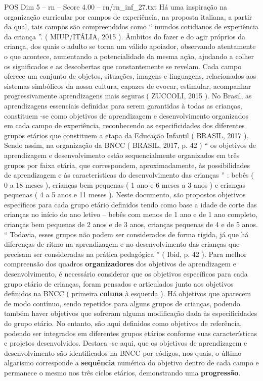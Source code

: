 \begin{textsample}{POS Dim 5 – rn – Score 4.00 – rn/rn\_inf\_27.txt}
Há uma inspiração na organização curricular por campos de experiência, na proposta italiana, a partir da qual, tais campos são compreendidos como “ mundos cotidianos de experiência da criança ”. ( MIUP/ITÁLIA, 2015 ).
Âmbitos do fazer e do agir próprios da criança, dos quais o adulto se torna um válido apoiador, observando atentamente o que acontece, aumentando a potencialidade da mesma ação, ajudando a colher os significados e as descobertas que constantemente se revelam.
Cada campo oferece um conjunto de objetos, situações, imagens e linguagens, relacionados aos sistemas simbólicos da nossa cultura, capazes de evocar, estimular, acompanhar progressivamente aprendizagens mais seguras ( ZUCCOLI, 2015 ).
No Brasil, as aprendizagens essenciais definidas para serem garantidas à todas as crianças, constituem -se como objetivos de aprendizagem e desenvolvimento organizados em cada campo de experiência, reconhecendo as especificidades dos diferentes grupos etários que constituem a etapa da Educação Infantil ( BRASIL, 2017 ).
Sendo assim, na organização da BNCC ( BRASIL, 2017, p. 42 ) “ os objetivos de aprendizagem e desenvolvimento estão sequencialmente organizados em três grupos por faixa etária, que correspondem, aproximadamente, às possibilidades de aprendizagem e às características do desenvolvimento das crianças ” : bebês ( 0 a 18 meses ), crianças bem pequenas ( 1 ano e 6 meses a 3 anos ) e crianças pequenas ( 4 a 5 anos e 11 meses ).
Neste documento, são propostos objetivos específicos para cada grupo etário definidos tendo como base a idade de corte das crianças no início do ano letivo – bebês com menos de 1 ano e de 1 ano completo, crianças bem pequenas de 2 anos e de 3 anos, crianças pequenas de 4 e de 5 anos. “ Todavia, esses grupos não podem ser considerados de forma rígida, já que há diferenças de ritmo na aprendizagem e no desenvolvimento das crianças que precisam ser consideradas na prática pedagógica ” ( Ibid, p. 42 ).
Para melhor compreensão dos quadros \textbf{organizadores} dos objetivos de aprendizagem e desenvolvimento, é necessário considerar que os objetivos específicos para cada grupo etário de crianças, foram pensados e articulados junto aos objetivos definidos na BNCC ( primeira \textbf{coluna} à esquerda ).
Há objetivos que aparecem de modo contínuo, sendo repetidos para alguns grupos de crianças, podendo também haver objetivos que sofreram alguma modificação dada às especificidades do grupo etário.
No entanto, são aqui definidos como objetivos de referência, podendo ser integrados em diferentes grupos etários conforme suas características e projetos desenvolvidos.
Destaca -se aqui, que os objetivos de aprendizagem e desenvolvimento são identificados na BNCC por códigos, nos quais, o último algarismo corresponde a \textbf{sequência} numérica do objetivo dentro de cada campo e permanece o mesmo nos três ciclos etários, demonstrando uma \textbf{progressão}.

\end{textsample}
